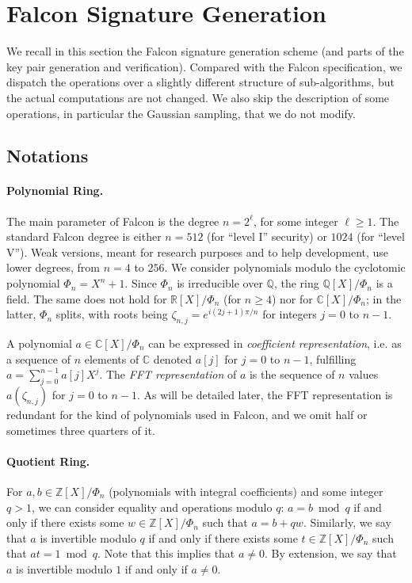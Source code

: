 \documentclass{llncs}
\newcommand{\bZ}{\mathbb{Z}}
\newcommand{\bR}{\mathbb{R}}
\newcommand{\bQ}{\mathbb{Q}}
\newcommand{\bC}{\mathbb{C}}
\begin{document}

\newpage
\section{Falcon Signature Generation}\label{sec:falcon-std}

We recall in this section the Falcon signature generation scheme (and
parts of the key pair generation and verification). Compared with the
Falcon specification\cite{FalconRound3}, we dispatch the operations over
a slightly different structure of sub-algorithms, but the actual
computations are not changed. We also skip the description of some
operations, in particular the Gaussian sampling, that we do not modify.

\subsection{Notations}

\paragraph{Polynomial Ring.}
The main parameter of Falcon is the degree $n = 2^\ell$, for some
integer $\ell \geq 1$. The standard Falcon degree is either $n = 512$
(for ``level I'' security) or $1024$ (for ``level V''). Weak versions,
meant for research purposes and to help development, use lower degrees,
from $n = 4$ to $256$. We consider polynomials modulo the cyclotomic
polynomial $\Phi_n = X^n + 1$. Since $\Phi_n$ is irreducible over $\bQ$,
the ring $\bQ[X]/\Phi_n$ is a field. The same does not hold for
$\bR[X]/\Phi_n$ (for $n\geq 4$) nor for $\bC[X]/\Phi_n$; in the latter,
$\Phi_n$ splits, with roots being $\zeta_{n,j} = e^{i(2j+1)\pi/n}$ for
integers $j = 0$ to $n - 1$.

A polynomial $a \in \bC[X]/\Phi_n$ can be expressed in \emph{coefficient
representation}, i.e. as a sequence of $n$ elements of $\bC$ denoted
$a[j]$ for $j = 0$ to $n - 1$, fulfilling $a = \sum_{j=0}^{n-1} a[j]
X^j$. The \emph{FFT representation} of $a$ is the sequence of $n$ values
$a(\zeta_{n,j})$ for $j = 0$ to $n - 1$. As will be detailed later, the
FFT representation is redundant for the kind of polynomials used in
Falcon, and we omit half or sometimes three quarters of it.

\paragraph{Quotient Ring.}
For $a, b\in\bZ[X]/\Phi_n$ (polynomials with integral coefficients) and
some integer $q > 1$, we can consider equality and operations modulo
$q$: $a = b \bmod q$ if and only if there exists some $w\in
\bZ[X]/\Phi_n$ such that $a = b + qw$. Similarly, we say that $a$ is
invertible modulo $q$ if and only if there exists some $t\in
\bZ[X]/\Phi_n$ such that $at = 1 \bmod q$. Note that this implies that
$a\neq 0$. By extension, we say that $a$ is invertible modulo $1$ if and
only if $a\neq 0$.
\end{document}
